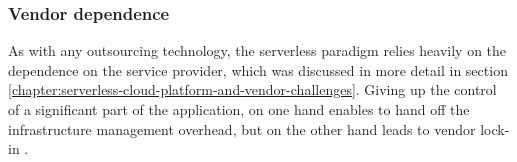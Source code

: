 





\subsubsection{Vendor dependence} \label{chapter:serverless-suitability-vendor-dependence}

As with any outsourcing technology, the serverless paradigm relies heavily on the dependence on the service provider, which was discussed in more detail in section \ref{chapter:serverless-cloud-platform-and-vendor-challenges}.
Giving up the control of a significant part of the application, on one hand enables to hand off the infrastructure management overhead, but on the other hand leads to vendor lock-in \cite{MartinFowlerServerless}.

